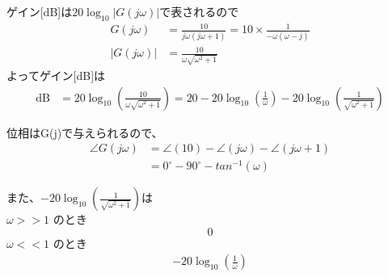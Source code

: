 \documentclass[a4paper,12pt]{article}
\begin{document}
\begin{tcolorbox}[title={7. \(G(s)=\dfrac{10}{s(s+1)}\)について、周波数応答関数、ゲイン(dB)、位相(deg.)を求めよ。
また、漸近線を用いてボード線図の概形を描け。各軸には適宜数値を記入し、折れ点等の特徴点を明示すること。}]

ゲイン[dB]は\(20\log_{10} \left| G(j\omega) \right|\)で表されるので\\
\vspace{-6mm}
\begin{align*}
    G(j\omega) &= \frac{10}{j\omega(j\omega + 1)} = 10 \times \frac{1}{-\omega(\omega - j)} \\
    \left| G(j\omega) \right| &= \frac{10}{\omega \sqrt{\omega^2 + 1}}
\end{align*}
よってゲイン[dB]は\\
\vspace{-6mm}
\begin{align*}
\mathrm{dB} &= 20 \log_{10} \left( \frac{10}{\omega \sqrt{\omega^2 + 1}} \right)
=20 -20 \log_{10} \left( \frac{1}{\omega} \right) - 20 \log_{10} \left( \frac{1}{ \sqrt{\omega^2 + 1}} \right)
\end{align*}

位相は\angle G(j\omega)で与えられるので、
\begin{align*}
\angle G(j\omega) &= \angle (10) - \angle (j\omega) - \angle (j\omega + 1)\\
                &= 0^\circ - 90^\circ- tan^{-1}(\omega)
\end{align*}



\begin{minipage}{0.45\linewidth}
\vspace{-24mm}
また、\(- 20 \log_{10} \left( \frac{1}{ \sqrt{\omega^2 + 1}} \right)\)は\\
\(\omega >> 1\) のとき
\[
    0
\]
\(\omega << 1\) のとき
\begin{align*}
    - 20 \log_{10} \left( \frac{1}{ \omega } \right)
\end{align*}
\end{minipage}
\hfill
\begin{minipage}{0.5\linewidth}
\begin{center}
\end{center}
\end{minipage}
\end{tcolorbox}
\end{document}
